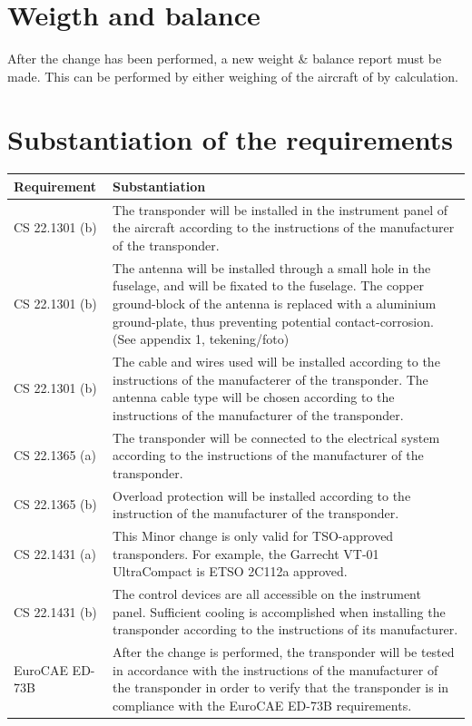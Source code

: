 \documentclass{article}
\begin{document}
\section{Weigth and balance}
After the change has been performed, a new weight \& balance report must be made. This can be performed by either weighing of the aircraft of by calculation.

\section{Substantiation of the requirements}
\begin{tabular}{|l|p{10cm}|}
\hline
Requirement & Substantiation \\
\hline
CS 22.1301 (b) & The transponder will be installed in the instrument panel of the aircraft according to the instructions of the manufacturer of the transponder. \\
\hline
CS 22.1301 (b) & The antenna will be installed through a small hole in the fuselage, and will be fixated to the fuselage. The copper ground-block of the antenna is replaced with a aluminium ground-plate, thus preventing potential contact-corrosion. (See appendix 1, tekening/foto) \\
\hline
CS 22.1301 (b) & The cable and wires used will be installed according to the instructions of the manufacterer of the transponder. The antenna cable type will be chosen according to the instructions of the manufacturer of the transponder. \\
\hline
CS 22.1365 (a) & The transponder will be connected to the electrical system according to the instructions of the manufacturer of the transponder. \\
\hline
CS 22.1365 (b) & Overload protection will be installed according to the instruction of the manufacturer of the transponder. \\
\hline
CS 22.1431 (a) & This Minor change is only valid for TSO-approved transponders. For example, the Garrecht VT-01 UltraCompact is ETSO 2C112a approved. \\
\hline
CS 22.1431 (b) & The control devices are all accessible on the instrument panel. Sufficient cooling is accomplished when installing the transponder according to the instructions of its manufacturer. \\
\hline
EuroCAE ED-73B & After the change is performed, the transponder will be tested in accordance with the instructions of the manufacturer of the transponder in order to verify that the transponder is in compliance with the EuroCAE ED-73B requirements. \\
\hline
\end{tabular}
\end{document}
